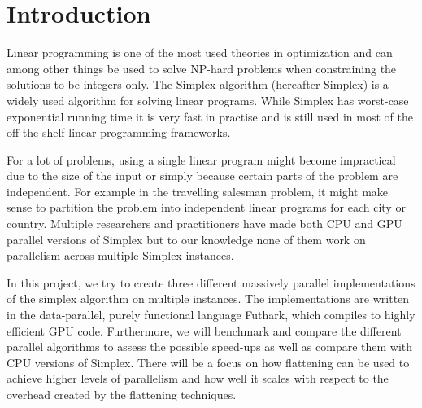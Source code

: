 \section{Introduction}
Linear programming is one of the most used theories in optimization and can among other things be used to solve NP-hard problems when constraining the solutions to be integers only. The Simplex algorithm (hereafter Simplex) is a widely used algorithm for solving linear programs. While Simplex has worst-case exponential running time it is very fast in practise and is still used in most of the off-the-shelf linear programming frameworks. 

For a lot of problems, using a single linear program might become impractical due to the size of the input or simply because certain parts of the problem are independent. For example in the travelling salesman problem, it might make sense to partition the problem into independent linear programs for each city or country. Multiple researchers and practitioners have made both CPU and GPU parallel versions of Simplex but to our knowledge none of them work on parallelism across multiple Simplex instances.

\newpar In this project, we try to create three different massively parallel implementations of the simplex algorithm on multiple instances. The implementations are written in the data-parallel, purely functional language Futhark, which compiles to highly efficient GPU code. Furthermore, we will benchmark and compare the different parallel algorithms to assess the possible speed-ups as well as compare them with CPU versions of Simplex. There will be a focus on how flattening can be used to achieve higher levels of parallelism and how well it scales with respect to the overhead created by the flattening techniques.

